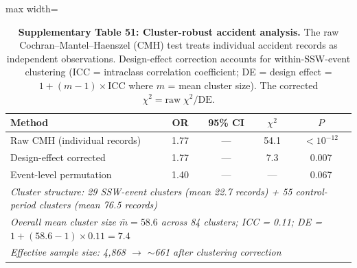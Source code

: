 \documentclass[11pt,letterpaper]{article}
\begin{document}
\begin{table}[!ht]
\centering
\caption{\textbf{Supplementary Table 51: Cluster-robust accident analysis.}
The raw Cochran--Mantel--Haenszel (CMH) test treats individual accident records as independent observations. Design-effect correction accounts for within-SSW-event clustering (ICC = intraclass correlation coefficient; DE = design effect = $1 + (m-1) \times \mathrm{ICC}$ where $m$ = mean cluster size). The corrected $\chi^2 = \mathrm{raw}\;\chi^2 / \mathrm{DE}$.}
\label{tab:gee_accident}
\small
\begin{adjustbox}{max width=\textwidth}
\begin{tabular}{lcccc}
\toprule
\textbf{Method} & \textbf{OR} & \textbf{95\% CI} & \textbf{$\chi^2$} & \textbf{$P$} \\
\midrule
Raw CMH (individual records) & 1.77 & --- & 54.1 & $< 10^{-12}$ \\
Design-effect corrected & 1.77 & --- & 7.3 & 0.007 \\
Event-level permutation & 1.40 & --- & --- & 0.067 \\
\midrule
\multicolumn{5}{l}{\textit{Cluster structure: 29 SSW-event clusters (mean 22.7 records) + 55 control-period clusters (mean 76.5 records)}} \\
\multicolumn{5}{l}{\textit{Overall mean cluster size $\bar{m} = 58.6$ across 84 clusters; ICC = 0.11; DE = $1 + (58.6-1) \times 0.11 = 7.4$}} \\
\multicolumn{5}{l}{\textit{Effective sample size: 4,868 $\to$ $\sim$661 after clustering correction}} \\
\bottomrule
\end{tabular}
\end{adjustbox}
\end{table}
\end{document}

